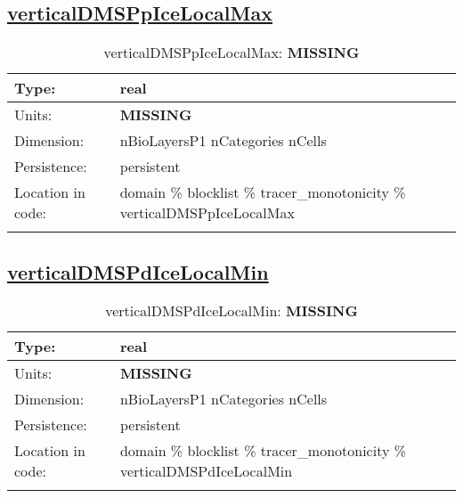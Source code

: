 \subsection[verticalDMSPpIceLocalMax]{\hyperref[sec:var_tab_tracer_monotonicity]{verticalDMSPpIceLocalMax}}
\label{subsec:var_sec_tracer_monotonicity_verticalDMSPpIceLocalMax}
\begin{center}
\begin{longtable}{| p{2.0in} | p{4.0in} |}
        \hline 
        Type: & real \\
        \hline 
        Units: & {\bf \color{red} MISSING} \\
        \hline 
        Dimension: & nBioLayersP1 nCategories nCells \\
        \hline 
        Persistence: & persistent \\
        \hline 
         Location in code: & domain \% blocklist \% tracer\_monotonicity \% verticalDMSPpIceLocalMax \\
         \hline 
    \caption{verticalDMSPpIceLocalMax: {\bf \color{red} MISSING}}
\end{longtable}
\end{center}
\subsection[verticalDMSPdIceLocalMin]{\hyperref[sec:var_tab_tracer_monotonicity]{verticalDMSPdIceLocalMin}}
\label{subsec:var_sec_tracer_monotonicity_verticalDMSPdIceLocalMin}
\begin{center}
\begin{longtable}{| p{2.0in} | p{4.0in} |}
        \hline 
        Type: & real \\
        \hline 
        Units: & {\bf \color{red} MISSING} \\
        \hline 
        Dimension: & nBioLayersP1 nCategories nCells \\
        \hline 
        Persistence: & persistent \\
        \hline 
         Location in code: & domain \% blocklist \% tracer\_monotonicity \% verticalDMSPdIceLocalMin \\
         \hline 
    \caption{verticalDMSPdIceLocalMin: {\bf \color{red} MISSING}}
\end{longtable}
\end{center}
